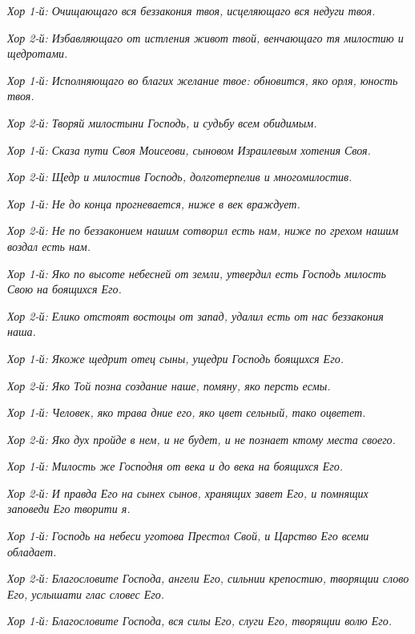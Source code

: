 \itshape Хор 1-й:\normalfont{} Очищающаго вся беззакония твоя, исцеляющаго вся недуги твоя.


\itshape Хор 2-й:\normalfont{} Избавляющаго от истления живот твой, венчающаго тя милостию и щедротами.


\itshape Хор 1-й:\normalfont{} Исполняющаго во благих желание твое: обновится, яко орля, юность твоя.


\itshape Хор 2-й:\normalfont{} Творяй милостыни Господь, и судьбу всем обидимым.


\itshape Хор 1-й:\normalfont{} Сказа пути Своя Моисеови, сыновом Израилевым хотения Своя.


\itshape Хор 2-й:\normalfont{} Щедр и милостив Господь, долготерпелив и многомилостив.


\itshape Хор 1-й:\normalfont{} Не до конца прогневается, ниже в век враждует.


\itshape Хор 2-й:\normalfont{} Не по беззаконием нашим сотворил есть нам, ниже по грехом нашим воздал есть нам.


\itshape Хор 1-й:\normalfont{} Яко по высоте небесней от земли, утвердил есть Господь милость Свою на боящихся Его.


\itshape Хор 2-й:\normalfont{} Елико отстоят востоцы от запад, удалил есть от нас беззакония наша.


\itshape Хор 1-й:\normalfont{} Якоже щедрит отец сыны, ущедри Господь боящихся Его.


\itshape Хор 2-й:\normalfont{} Яко Той позна создание наше, помяну, яко персть есмы.


\itshape Хор 1-й:\normalfont{} Человек, яко трава дние его, яко цвет сельный, тако оцветет.


\itshape Хор 2-й:\normalfont{} Яко дух пройде в нем, и не будет, и не познает ктому места своего.


\itshape Хор 1-й:\normalfont{} Милость же Господня от века и до века на боящихся Его.


\itshape Хор 2-й:\normalfont{} И правда Его на сынех сынов, хранящих завет Его, и помнящих заповеди Его творити я.


\itshape Хор 1-й:\normalfont{} Господь на небеси уготова Престол Свой, и Царство Его всеми обладает.


\itshape Хор 2-й:\normalfont{} Благословите Господа, ангели Его, сильнии крепостию, творящии слово Его, услышати глас словес Его.


\itshape Хор 1-й:\normalfont{} Благословите Господа, вся силы Его, слуги Его, творящии волю Его.


